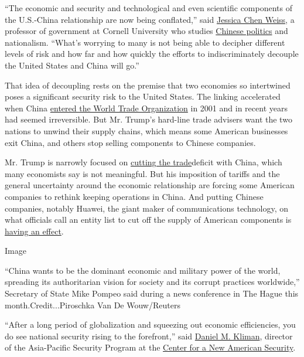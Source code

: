``The economic and security and technological and even scientific
components of the U.S.-China relationship are now being conflated,''
said \href{https://government.cornell.edu/jessica-chen-weiss}{Jessica
Chen Weiss}, a professor of government at Cornell University who studies
\href{https://www.foreignaffairs.com/articles/china/2019-06-11/world-safe-autocracy}{Chinese
politics} and nationalism. ``What's worrying to many is not being able
to decipher different levels of risk and how far and how quickly the
efforts to indiscriminately decouple the United States and China will
go.''

That idea of decoupling rests on the premise that two economies so
intertwined poses a significant security risk to the United States. The
linking accelerated when China
\href{https://www.foreignaffairs.com/articles/china/2018-04-02/was-letting-china-wto-mistake}{entered
the World Trade Organization} in 2001 and in recent years had seemed
irreversible. But Mr. Trump's hard-line trade advisers want the two
nations to unwind their supply chains, which means some American
businesses exit China, and others stop selling components to Chinese
companies.

Mr. Trump is narrowly focused on
\href{https://www.nytimes3xbfgragh.onion/2019/03/06/us/politics/us-trade-deficit.html}{cutting
the trade}deficit with China, which many economists say is not
meaningful. But his imposition of tariffs and the general uncertainty
around the economic relationship are forcing some American companies to
rethink keeping operations in China. And putting Chinese companies,
notably Huawei, the giant maker of communications technology, on what
officials call an entity list to cut off the supply of American
components is
\href{https://www.nytimes3xbfgragh.onion/2019/05/20/technology/google-android-huawei.html}{having
an effect}.

Image

``China wants to be the dominant economic and military power of the
world, spreading its authoritarian vision for society and its corrupt
practices worldwide,'' Secretary of State Mike Pompeo said during a news
conference in The Hague this month.Credit...Piroschka Van De
Wouw/Reuters

``After a long period of globalization and squeezing out economic
efficiencies, you do see national security rising to the forefront,''
said \href{https://www.cnas.org/people/daniel-kliman}{Daniel M. Kliman},
director of the Asia-Pacific Security Program at the
\href{https://www.cnas.org/}{Center for a New American Security}.

